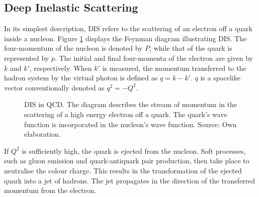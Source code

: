 \subsection{Deep Inelastic Scattering} \label{sec::dis}
    In its simplest description, DIS refers to the scattering of an electron off a quark inside a nucleon.
    Figure \ref{fig::dis_diagram} displays the Feynman diagram illustrating DIS.
    The four-momentum of the nucleon is denoted by $P$, while that of the quark is represented by $p$.
    The initial and final four-momenta of the electron are given by $k$ and $k'$, respectively.
    When $k'$ is measured, the momentum transferred to the hadron system by the virtual photon is defined as $q = k - k'$.
    $q$ is a spacelike vector conventionally denoted as $q^2 = -Q^2$.

    \begin{figure}[h!]
        \centering{}
        \caption[DIS in QCD.]{DIS in QCD. The diagram describes the stream of momentum in the scattering of a high energy electron off a quark. The quark's wave function is incorporated in the nucleon's wave function. Source: Own elaboration.}
        \label{fig::dis_diagram}
    \end{figure}

    If $Q^2$ is sufficiently high, the quark is ejected from the nucleon.
    Soft processes, such as gluon emission and quark-antiquark pair production, then take place to neutralise the colour charge.
    This results in the transformation of the ejected quark into a jet of hadrons.
    The jet propagates in the direction of the transferred momentum from the electron.

    
    
    
